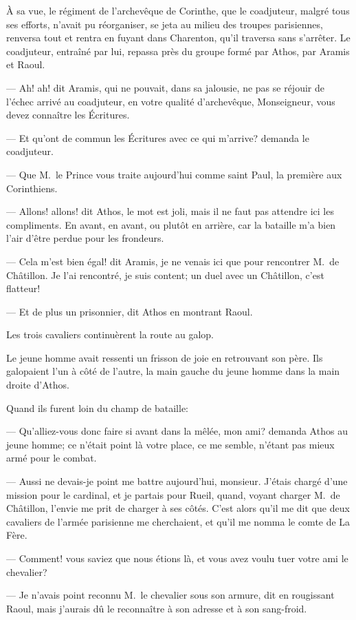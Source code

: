À sa vue, le régiment de l'archevêque de Corinthe, que le coadjuteur, malgré tous ses efforts, n'avait pu réorganiser, se jeta au milieu des troupes parisiennes, renversa tout et rentra en fuyant dans Charenton, qu'il traversa sans s'arrêter. Le coadjuteur, entraîné par lui, repassa près du groupe formé par Athos, par Aramis et Raoul.

— Ah! ah! dit Aramis, qui ne pouvait, dans sa jalousie, ne pas se réjouir de l'échec arrivé au coadjuteur, en votre qualité d'archevêque, Monseigneur, vous devez connaître les Écritures.

— Et qu'ont de commun les Écritures avec ce qui m'arrive? demanda le coadjuteur.

— Que M.~le Prince vous traite aujourd'hui comme saint Paul, la première aux Corinthiens.

— Allons! allons! dit Athos, le mot est joli, mais il ne faut pas attendre ici les compliments. En avant, en avant, ou plutôt en arrière, car la bataille m'a bien l'air d'être perdue pour les frondeurs.

— Cela m'est bien égal! dit Aramis, je ne venais ici que pour rencontrer M.~de Châtillon. Je l'ai rencontré, je suis content; un duel avec un Châtillon, c'est flatteur!

— Et de plus un prisonnier, dit Athos en montrant Raoul.

Les trois cavaliers continuèrent la route au galop.

Le jeune homme avait ressenti un frisson de joie en retrouvant son père. Ils galopaient l'un à côté de l'autre, la main gauche du jeune homme dans la main droite d'Athos.

Quand ils furent loin du champ de bataille:

— Qu'alliez-vous donc faire si avant dans la mêlée, mon ami? demanda Athos au jeune homme; ce n'était point là votre place, ce me semble, n'étant pas mieux armé pour le combat.

— Aussi ne devais-je point me battre aujourd'hui, monsieur. J'étais chargé d'une mission pour le cardinal, et je partais pour Rueil, quand, voyant charger M.~de Châtillon, l'envie me prit de charger à ses côtés. C'est alors qu'il me dit que deux cavaliers de l'armée parisienne me cherchaient, et qu'il me nomma le comte de La Fère.

— Comment! vous saviez que nous étions là, et vous avez voulu tuer votre ami le chevalier?

— Je n'avais point reconnu M.~le chevalier sous son armure, dit en rougissant Raoul, mais j'aurais dû le reconnaître à son adresse et à son sang-froid.

